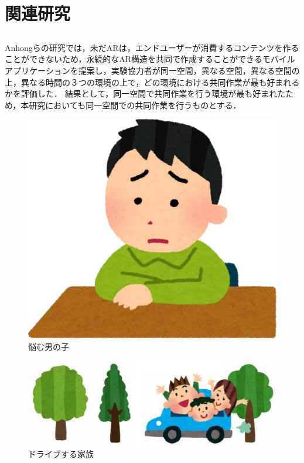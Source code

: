 \documentclass[a4paper,10pt,twocolumn,uplatex]{jsarticle}
\begin{document}
\section{関連研究}
\subsection{}
Anhongらの研究では\cite{collaborative}，未だARは，エンドユーザーが消費するコンテンツを作ることができないため，永続的なAR構造を共同で作成することができるモバイルアプリケーションを提案し，実験協力者が同一空間，異なる空間，異なる空間の上，異なる時間の３つの環境の上で，どの環境における共同作業が最も好まれるかを評価した．
結果として，同一空間で共同作業を行う環境が最も好まれたため，本研究においても同一空間での共同作業を行うものとする．


\begin{figure}[!tb]
  \centering
  \includegraphics[width=\linewidth]{img/sample1.pdf}
  \caption{悩む男の子}
  \label{fig:sample1}
\end{figure}

\begin{figure}[!tb]
  \centering
  \includegraphics[width=\linewidth]{img/sample2.pdf}
  \caption{ドライブする家族}
  \label{fig:sample2}
\end{figure}
\end{document}
